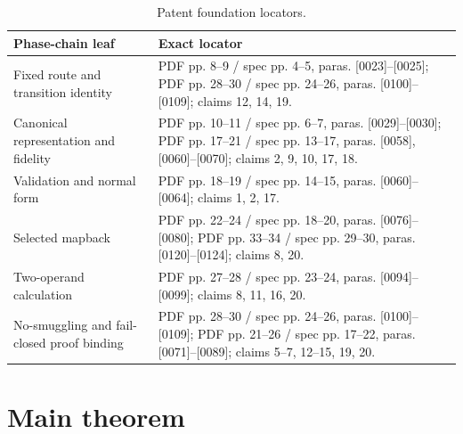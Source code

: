 \documentclass[11pt,letterpaper]{article}
\theoremstyle{definition}
\begin{document}
\begin{table}[ht]
\centering\footnotesize
\caption{Patent foundation locators.}\label{tab:patent-locators}
\begin{tabularx}{\textwidth}{@{}lY@{}}
\toprule
Phase-chain leaf & Exact locator\\
\midrule
Fixed route and transition identity & PDF pp. 8--9 / spec pp. 4--5,
paras. [0023]--[0025]; PDF pp. 28--30 / spec pp. 24--26,
paras. [0100]--[0109]; claims 12, 14, 19.\\
Canonical representation and fidelity & PDF pp. 10--11 / spec pp. 6--7,
paras. [0029]--[0030]; PDF pp. 17--21 / spec pp. 13--17,
paras. [0058], [0060]--[0070]; claims 2, 9, 10, 17, 18.\\
Validation and normal form & PDF pp. 18--19 / spec pp. 14--15,
paras. [0060]--[0064]; claims 1, 2, 17.\\
Selected mapback & PDF pp. 22--24 / spec pp. 18--20,
paras. [0076]--[0080]; PDF pp. 33--34 / spec pp. 29--30,
paras. [0120]--[0124]; claims 8, 20.\\
Two-operand calculation & PDF pp. 27--28 / spec pp. 23--24,
paras. [0094]--[0099]; claims 8, 11, 16, 20.\\
No-smuggling and fail-closed proof binding & PDF pp. 28--30 / spec
pp. 24--26, paras. [0100]--[0109]; PDF pp. 21--26 / spec pp. 17--22,
paras. [0071]--[0089]; claims 5--7, 12--15, 19, 20.\\
\bottomrule
\end{tabularx}
\end{table}

\section{Main theorem}
\end{document}
